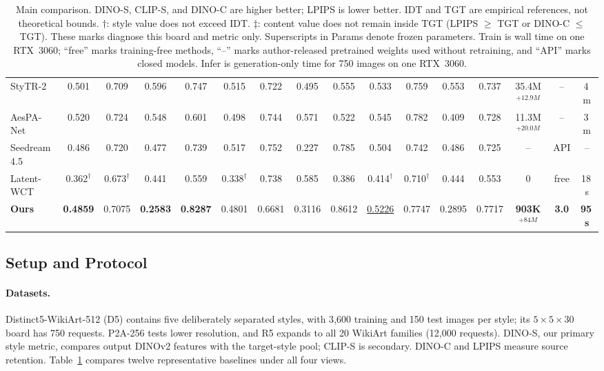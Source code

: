 \documentclass[letterpaper]{article}
\begin{document}
\begin{table}[t!]
{\begin{tabular}{@{}lccccccccccccccc@{}}
StyTR-2 & 0.501 & 0.709 & 0.596 & 0.747 & 0.515 & 0.722 & 0.495 & 0.555 & 0.533 & 0.759 & 0.553 & 0.737 & 35.4M$^{+12.9M}$ & -- & 4\,m \\
AesPA-Net & 0.520 & 0.724 & 0.548 & 0.601 & 0.498 & 0.744 & 0.571 & 0.522 & 0.545 & 0.782 & 0.409 & 0.728 & 11.3M$^{+20.0M}$ & -- & 3\,m \\
Seedream 4.5 & 0.486 & 0.720 & 0.477 & 0.739 & 0.517 & 0.752 & 0.227 & 0.785 & 0.504 & 0.742 & 0.486 & 0.725 & -- & API & -- \\
Latent-WCT & 0.362$^{\dagger}$ & 0.673$^{\dagger}$ & 0.441 & 0.559 & 0.338$^{\dagger}$ & 0.738 & 0.585 & 0.386 & 0.414$^{\dagger}$ & 0.710$^{\dagger}$ & 0.444 & 0.553 & 0 & free & 18\,s \\
\midrule
\textbf{Ours} & \textbf{0.4859} & 0.7075 & \textbf{0.2583} & \textbf{0.8287} & 0.4801 & 0.6681 & 0.3116 & 0.8612 & \underline{0.5226} & 0.7747 & 0.2895 & 0.7717 & \textbf{903K$^{+84M}$} & \textbf{3.0} & \textbf{95\,s} \\
\bottomrule
\end{tabular}%
}
\caption{Main comparison. DINO-S, CLIP-S, and DINO-C are higher better; LPIPS is lower better. IDT and TGT are empirical references, not theoretical bounds. $\dagger$: style value does not exceed IDT. $\ddagger$: content value does not remain inside TGT (LPIPS $\geq$ TGT or DINO-C $\leq$ TGT). These marks diagnose this board and metric only. Superscripts in Params denote frozen parameters. Train is wall time on one RTX~3060; ``free'' marks training-free methods, ``--'' marks author-released pretrained weights used without retraining, and ``API'' marks closed models. Infer is generation-only time for 750 images on one RTX~3060.}
\label{tab:main}
\end{table}



\subsection{Setup and Protocol}
\label{sec:setup}

\paragraph{Datasets.}
Distinct5-WikiArt-512 (D5) contains five deliberately separated styles, with 3{,}600
training and 150 test images per style; its $5{\times}5{\times}30$ board has 750 requests.
P2A-256 tests lower resolution, and R5 expands to all 20 WikiArt families (12{,}000
requests). DINO-S, our primary style metric, compares output DINOv2 features with the
target-style pool; CLIP-S is secondary. DINO-C and LPIPS measure source retention.
Table~\ref{tab:main} compares twelve representative baselines under all four views.
\end{document}
